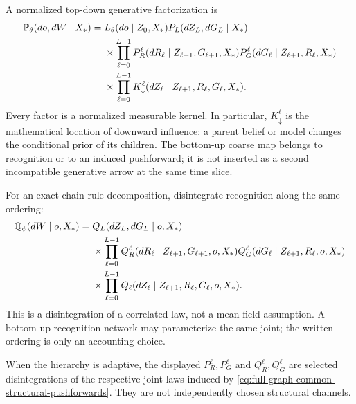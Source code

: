 A normalized top-down generative factorization is
\begin{align}
\mathbb P_\theta(do,dW\mid X_*)
={}&L_\theta(do\mid Z_0,X_*)P_L(dZ_L,dG_L\mid X_*)
\nonumber\\
&\times\prod_{\ell=0}^{L-1}
P_R^\ell(dR_\ell\mid Z_{\ell+1},G_{\ell+1},X_*)
P_G^\ell(dG_\ell\mid Z_{\ell+1},R_\ell,X_*)
\nonumber\\
&\times\prod_{\ell=0}^{L-1}
K_\downarrow^\ell(dZ_\ell\mid Z_{\ell+1},R_\ell,G_\ell,X_*).
\label{eq:full-graph-generative-factorization}
\end{align}
Every factor is a normalized measurable kernel. In particular,
$K_\downarrow^\ell$ is the mathematical location of downward influence: a parent
belief or model changes the conditional prior of its children. The bottom-up
coarse map belongs to recognition or to an induced pushforward; it is not
inserted as a second incompatible generative arrow at the same time slice.

For an exact chain-rule decomposition, disintegrate recognition along the same
ordering:
\begin{align}
\mathbb Q_\phi(dW\mid o,X_*)
={}&Q_L(dZ_L,dG_L\mid o,X_*)
\nonumber\\
&\times\prod_{\ell=0}^{L-1}
Q_R^\ell(dR_\ell\mid Z_{\ell+1},G_{\ell+1},o,X_*)
Q_G^\ell(dG_\ell\mid Z_{\ell+1},R_\ell,o,X_*)
\nonumber\\
&\times\prod_{\ell=0}^{L-1}
Q_\ell(dZ_\ell\mid Z_{\ell+1},R_\ell,G_\ell,o,X_*).
\label{eq:full-graph-recognition-factorization}
\end{align}
This is a disintegration of a correlated law, not a mean-field assumption. A
bottom-up recognition network may parameterize the same joint; the written
ordering is only an accounting choice. 

When the hierarchy is adaptive, the displayed $P_R^\ell,P_G^\ell$ and
$Q_R^\ell,Q_G^\ell$ are selected disintegrations of the respective joint laws
induced by \eqref{eq:full-graph-common-structural-pushforwards}. They are not
independently chosen structural channels.

